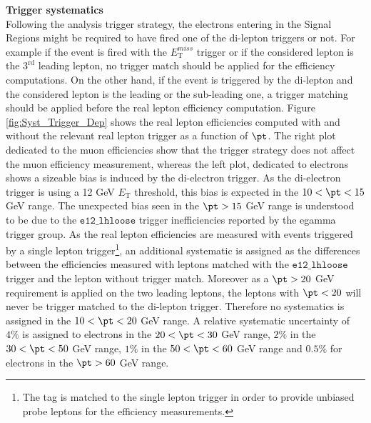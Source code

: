 		\par{\bf Trigger systematics\\}
		Following the analysis trigger strategy, the electrons entering in the Signal Regions might be required to have fired one of the di-lepton triggers or not. For example if the event is fired with the $E_{\mathrm{T}}^{miss}$ trigger or if the considered lepton is the $3^{\mathrm{rd}}$ leading lepton, no trigger match should be applied for the efficiency computations. On the other hand, if the event is triggered by the di-lepton and the considered lepton is the leading or the sub-leading one, a trigger matching should be applied before the real lepton efficiency computation.
                Figure \ref{fig:Syst_Trigger_Dep} shows the real lepton efficiencies computed with and without the relevant real lepton trigger as a function of $\pt$. The right plot dedicated to the muon efficiencies show that the trigger strategy does not affect the muon efficiency measurement, whereas the left plot, dedicated to electrons shows a sizeable bias is induced by the di-electron trigger. As the di-electron trigger is using a 12 GeV $E_{\mathrm{T}}$ threshold, this bias is expected in the $10 < \pt < 15$ GeV range. The unexpected bias seen in the $\pt > 15$ GeV range is understood to be due to the $\texttt{e12\_lhloose}$ trigger inefficiencies reported by the egamma trigger group. As the real lepton efficiencies are measured with events triggered by a single lepton trigger\footnote{The tag is matched to the single lepton trigger in order to provide unbiased probe leptons for the efficiency measurements.}, an additional systematic is assigned as the differences between the efficiencies measured with leptons matched with the $\texttt{e12\_lhloose}$ trigger and the lepton without trigger match. Moreover as a $\pt > 20$ GeV requirement is applied on the two leading leptons, the leptons with $\pt < 20$ will never be trigger matched to the di-lepton trigger. Therefore no systematics is assigned in the $10 < \pt < 20$ GeV range. A relative systematic uncertainty of $4\%$ is assigned to electrons in the $20 < \pt < 30$ GeV range, $2\%$ in the $30 < \pt < 50$ GeV range, $1\%$ in the $50 < \pt < 60$ GeV range and $0.5\%$ for electrons in the $\pt > 60$ GeV range.
					
